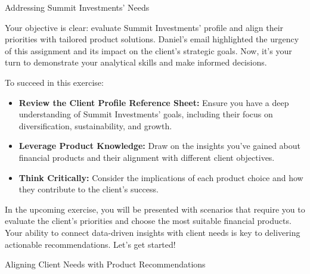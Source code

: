 \documentclass[11pt]{article}
\begin{document}

\newpage
{\fontsize{26}{30}\selectfont Addressing Summit Investments' Needs}\par\bigskip

Your objective is clear: evaluate Summit Investments' profile and align their
priorities with tailored product solutions. Daniel's email highlighted the
urgency of this assignment and its impact on the client's strategic goals.
Now, it's your turn to demonstrate your analytical skills and make informed
decisions.

To succeed in this exercise:
\begin{itemize}[leftmargin=1.5em, itemsep=2pt]
  \item \textbf{Review the Client Profile Reference Sheet:} Ensure you have a
  deep understanding of Summit Investments' goals, including their focus on
  diversification, sustainability, and growth.
  \item \textbf{Leverage Product Knowledge:} Draw on the insights you've gained
  about financial products and their alignment with different client
  objectives.
  \item \textbf{Think Critically:} Consider the implications of each product
  choice and how they contribute to the client's success.
\end{itemize}


In the upcoming exercise, you will be presented with scenarios that require
you to evaluate the client's priorities and choose the most suitable financial
products. Your ability to connect data-driven insights with client needs is
key to delivering actionable recommendations. Let's get started!

\newpage
{\fontsize{26}{30}\selectfont Aligning Client Needs with Product Recommendations}\par\bigskip

\end{document}
